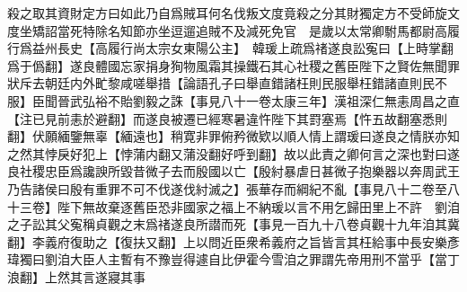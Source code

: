 殺之取其資財定方曰如此乃自爲賊耳何名伐叛文度竟殺之分其財獨定方不受師旋文度坐矯詔當死特除名知節亦坐逗遛追賊不及減死免官　是歲以太常卿駙馬都尉高履行爲益州長史【高履行尚太宗女東陽公主】　韓瑗上疏爲禇遂良訟寃曰【上時掌翻爲于僞翻】遂良體國忘家捐身狥物風霜其操鐵石其心社稷之舊臣陛下之賢佐無聞罪狀斥去朝廷内外甿黎咸嗟舉措【論語孔子曰舉直錯諸枉則民服舉枉錯諸直則民不服】臣聞晉武弘裕不貽劉毅之誅【事見八十一卷太康三年】漢祖深仁無恚周昌之直【注已見前恚於避翻】而遂良被遷已經寒暑違忤陛下其罸塞焉【忤五故翻塞悉則翻】伏願緬鑒無辜【緬遠也】稍寛非罪俯矜微欵以順人情上謂瑗曰遂良之情朕亦知之然其悖戾好犯上【悖蒲内翻又蒲没翻好呼到翻】故以此責之卿何言之深也對曰遂良社稷忠臣爲讒諛所毀昔微子去而殷國以亡【殷紂暴虐日甚微子抱樂器以奔周武王乃告諸侯曰殷有重罪不可不伐遂伐紂滅之】張華存而綱紀不亂【事見八十二卷至八十三卷】陛下無故棄逐舊臣恐非國家之福上不納瑗以言不用乞歸田里上不許　劉洎之子訟其父寃稱貞觀之末爲禇遂良所譛而死【事見一百九十八卷貞觀十九年洎其冀翻】李義府復助之【復扶又翻】上以問近臣衆希義府之旨皆言其枉給事中長安樂彥瑋獨曰劉洎大臣人主暫有不豫豈得遽自比伊霍今雪洎之罪謂先帝用刑不當乎【當丁浪翻】上然其言遂寢其事

